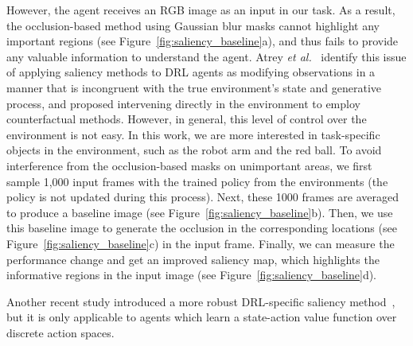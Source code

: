However, the agent receives an RGB image as an input in our task. As a result, the occlusion-based method using Gaussian blur masks cannot highlight any important regions (see Figure~\ref{fig:saliency_baseline}a), and thus fails to provide any valuable information to understand the agent. Atrey \textit{et al.}~\cite{atrey2020exploratory} identify this issue of applying saliency methods to DRL agents as modifying observations in a manner that is incongruent with the true environment's state and generative process, and proposed intervening directly in the environment to employ counterfactual methods. However, in general, this level of control over the environment is not easy. In this work, we are more interested in task-specific objects in the environment, such as the robot arm and the red ball. To avoid interference from the occlusion-based masks on unimportant areas, we first sample 1,000 input frames with the trained policy from the environments (the policy is not updated during this process). Next, these 1000 frames are averaged to produce a baseline image (see Figure~\ref{fig:saliency_baseline}b). Then, we use this baseline image to generate the occlusion in the corresponding locations (see Figure~\ref{fig:saliency_baseline}c) in the input frame. Finally, we can measure the performance change and get an improved saliency map, which highlights the informative regions in the input image  (see Figure~\ref{fig:saliency_baseline}d).

Another recent study introduced a more robust DRL-specific saliency method~\cite{puri2020explain}, but it is only applicable to agents which learn a state-action value function over discrete action spaces.
